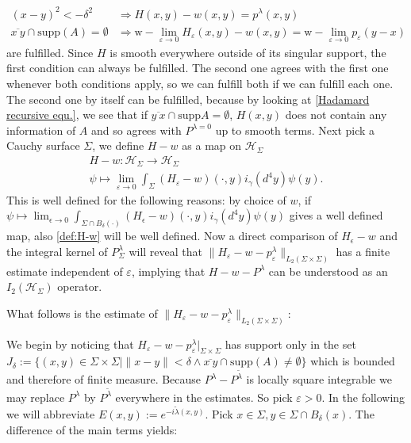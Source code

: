 \documentclass[a4paper,11pt]{article}
\begin{document}
\begin{align}
(x-y)^2< - \delta^2 &\Rightarrow H(x,y)-w(x,y) =p^\lambda(x,y)\\
\overline{x~ y}\cap \text{supp}(A)=\emptyset &\Rightarrow  \mathrm{w}\!\!-\!\!\lim_{\varepsilon\rightarrow 0} H_\varepsilon(x,y)-w(x,y)= \mathrm{w}\!\!-\!\! \lim_{\varepsilon\rightarrow 0} p_\varepsilon(y-x)
\end{align}
are fulfilled. Since \(H\) is smooth everywhere outside of its singular support, the first condition can always be fulfilled.
The second one agrees with the first one whenever both conditions apply, so we can fulfill both if we can fulfill each one.
The second one by itself can be fulfilled, because by looking at \eqref{Hadamard recursive equ.}, we see that if  
\(\overline{y ~x}\cap \text{supp}A=\emptyset\), \(H(x,y)\) does not contain any information of \(A\) and so agrees with \(P^{\lambda=0}\)
up to smooth terms.
Next pick a Cauchy surface \(\Sigma\), we define \(H-w\) as a  map on \(\mathcal{H}_\Sigma\)
\begin{align}\label{def:H-w}
H-w: \mathcal{H}_\Sigma \rightarrow \mathcal{H}_\Sigma\\
\psi \mapsto \lim_{\varepsilon \rightarrow 0} \int_{\Sigma} (H_\varepsilon - w)(\cdot,y) i_\gamma(d^4y) \psi(y).
\end{align}
This is well defined for the following reasons: by choice of \(w\), if 
\(\psi \mapsto \lim_{\epsilon \rightarrow 0} \int_{\Sigma \cap B_\delta (\cdot)} (H_\epsilon -w)(\cdot, y) i_\gamma(d^4 y) \psi(y)\) 
gives a well defined map, also \eqref{def:H-w} will be well defined. Now a direct comparison of \(H_\epsilon - w\) and the 
integral kernel of \(P_\Sigma^\lambda\) will reveal that \(\| H_\varepsilon-w-p^\lambda_{\varepsilon}\|_{L_{2}(\Sigma\times \Sigma)}\) has a finite estimate
independent of \(\varepsilon\), implying that \(H-w-P^\lambda\) can be understood as an \( I_2(\mathcal{H}_{\Sigma})\) operator. 

What follows is the estimate of \( \| H_\varepsilon-w-p^\lambda_{\varepsilon}\|_{L_{2}(\Sigma\times \Sigma)}\):

We begin by noticing that \(H_\varepsilon-w-p^\lambda_{\varepsilon}|_{\Sigma\times \Sigma}\) has support only in the set \(J_\delta:=\{(x,y)\in \Sigma \times \Sigma \mid \|x-y\|<\delta\wedge \overline{x ~ y} \cap \text{supp}(A)\neq \emptyset \}\) which is bounded and therefore of finite measure.  
Because \(P^\lambda-P^{\tilde{\lambda}}\) is locally square integrable we may replace 
\(P^\lambda \) by \(P^{\tilde{\lambda}}\) everywhere in the estimates.
So pick \(\varepsilon>0 \). In the following we will abbreviate \(E(x,y):=e^{-i \tilde{\lambda}(x,y)} \). Pick \(x\in \Sigma, y\in \Sigma \cap B_\delta(x) \). The difference of the main terms yields:
\end{document}
